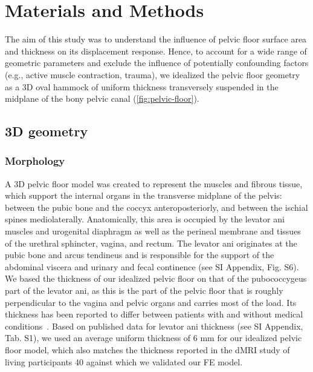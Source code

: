 \documentclass[9pt,twocolumn,twoside]{pnas-new}
\begin{document}
\section*{Materials and Methods}
The aim of this study was to understand the influence of pelvic floor surface area and thickness on its displacement response. Hence, to account for a wide range of geometric parameters and exclude the influence of potentially confounding factors (e.g., active muscle contraction, trauma), we idealized the pelvic floor geometry as a 3D oval hammock of uniform thickness transversely suspended in the midplane of the bony pelvic canal (\cref{fig:pelvic-floor}).
\subsection*{3D geometry}
\subsubsection*{Morphology}
A 3D pelvic floor model was created to represent the muscles and fibrous tissue, which support the internal organs in the transverse midplane of the pelvis: between the pubic bone and the coccyx anteroposteriorly, and between the ischial spines mediolaterally. Anatomically, this area is occupied by the levator ani muscles and urogenital diaphragm as well as the perineal membrane and tissues of the urethral sphincter, vagina, and rectum. The levator ani originates at the pubic bone and arcus tendineus and is responsible for the support of the abdominal viscera and urinary and fecal continence (see SI Appendix, Fig. S6). 
We based the thickness of our idealized pelvic floor on that of the pubococcygeus part of the levator ani, as this is the part of the pelvic floor that is roughly perpendicular to the vagina and pelvic organs and carries most of the load. Its thickness has been reported to differ between patients with and without medical conditions~\cite{Morkved2004-bi,Mayeur2016-qi,Wijma2007-hh}. Based on published data for levator ani thickness (see SI Appendix, Tab. S1), we used an average uniform thickness of 6 mm for our idealized pelvic floor model, which also matches the thickness reported in the dMRI study of living participants 40 against which we validated our FE model. 
\end{document}

